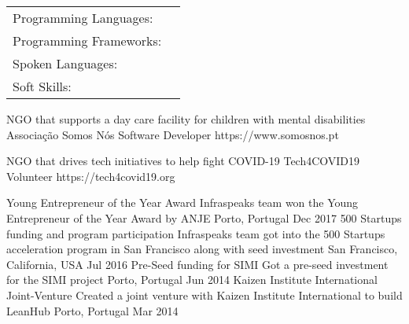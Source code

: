 \documentclass[]{awesome-cv}
\begin{document}
\vspace{-6mm}
\begin{cventries}
	\vspace{-2mm}
	\cventry
	{}
	{\def\arraystretch{1.15}{\begin{tabular}{ l l }
		Programming Languages:  & {\skill{ Hack, Kotlin, Java, JavaScript, Perl, SQL, PHP, C++}} \\
		Programming Frameworks:  & {\skill{ React, React Native, Android, ionic, jQuery, Laravel, Vue.js, Quasar, Play Framework}} \\
		Spoken Languages:  & {\skill{ English, Portuguese, French, Spanish, Slovene}} \\
		Soft Skills:  & {\skill{ Ability to Work Under Pressure, Self-motivation, Creativity, Good communication}} \\
		\end{tabular}}}
	{}
	{}
	{}
\end{cventries}

\vspace{-10mm}
\begin{cventries}
 	\cventry
	{NGO that supports a day care facility for children with mental disabilities}
	{Associação Somos Nós}
	{Software Developer}
	{https://www.somosnos.pt}
	{}

	\vspace{-5mm}
	\cventry
	{NGO that drives tech initiatives to help fight COVID-19}
	{Tech4COVID19}
	{Volunteer}
	{https://tech4covid19.org}
	{}

	\vspace{-5mm}
\end{cventries}
\begin{cvhonors}
	\cvhonor
	{Young Entrepreneur of the Year Award}
	{Infraspeak\textquotesingle{}s team won the Young Entrepreneur of the Year Award by ANJE}
	{Porto, Portugal}
	{Dec 2017}
	\cvhonor
	{500 Startups funding and program participation}
	{Infraspeak\textquotesingle{}s team got into the 500 Startups acceleration program in San Francisco along with seed investment}
	{San Francisco, California, USA}
	{Jul 2016}
	\cvhonor
	{Pre-Seed funding for SIMI}
	{Got a pre-seed investment for the SIMI project}
	{Porto, Portugal}
	{Jun 2014}
	\cvhonor
	{Kaizen Institute International Joint-Venture}
	{Created a joint venture with Kaizen Institute International to build LeanHub}
	{Porto, Portugal}
	{Mar 2014}
\end{cvhonors}
\
\end{document}

